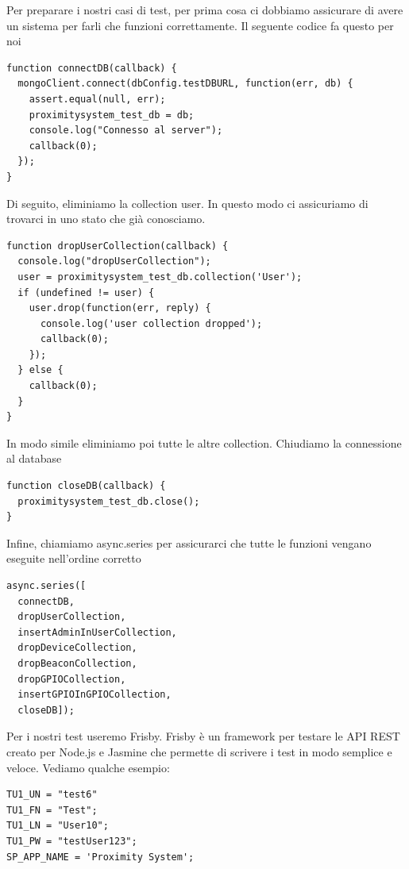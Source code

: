 Per preparare i nostri casi di test, per prima cosa ci dobbiamo assicurare di avere un sistema per farli che funzioni correttamente. 
Il seguente codice fa questo per noi

\begin{lstlisting}[caption={test/config/setup\_tests.js - connectDB}, style=javaScriptCode]
function connectDB(callback) {
  mongoClient.connect(dbConfig.testDBURL, function(err, db) {
    assert.equal(null, err);
    proximitysystem_test_db = db;
    console.log("Connesso al server");
    callback(0);
  });
}
\end{lstlisting}

Di seguito, eliminiamo la collection user. 
In questo modo ci assicuriamo di trovarci in uno stato che già conosciamo.

\begin{lstlisting}[caption={test/config/setup\_tests.js - dropUserCollection}, style=javaScriptCode]
function dropUserCollection(callback) {
  console.log("dropUserCollection");
  user = proximitysystem_test_db.collection('User');
  if (undefined != user) {
    user.drop(function(err, reply) {
      console.log('user collection dropped');
      callback(0);
    });
  } else {
    callback(0);
  }
}
\end{lstlisting}

In modo simile eliminiamo poi tutte le altre collection.
Chiudiamo la connessione al database

\begin{lstlisting}[caption={test/config/setup\_tests.js - closeDB}, style=javaScriptCode]
function closeDB(callback) {
  proximitysystem_test_db.close();
}
\end{lstlisting}

Infine, chiamiamo async.series per assicurarci che tutte le funzioni vengano eseguite nell’ordine corretto

\begin{lstlisting}[caption={test/config/setup\_tests.js - async}, style=javaScriptCode]
async.series([
  connectDB,
  dropUserCollection,
  insertAdminInUserCollection,
  dropDeviceCollection,
  dropBeaconCollection,
  dropGPIOCollection,
  insertGPIOInGPIOCollection,
  closeDB]);
\end{lstlisting}

Per i nostri test useremo Frisby.
Frisby è un framework per testare le API REST creato per Node.js e Jasmine che permette di scrivere i test in modo semplice e veloce.
Vediamo qualche esempio:

\begin{lstlisting}[caption={test/user/create\_accounts\_error\_spec.js}, style=javaScriptCode]
TU1_UN = "test6"
TU1_FN = "Test";
TU1_LN = "User10";
TU1_PW = "testUser123";
SP_APP_NAME = 'Proximity System';
\end{lstlisting}

